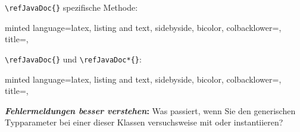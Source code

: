 \documentclass[
    ngerman,
    accentcolor=3b,
    dark_mode,
    fontsize= 12pt,
    a4paper,
    aspectratio=169,
    colorback=true,
    fancy_row_colors,
    leqno,
    fleqn,
    boxarc=3pt,
    fleqn,
]{algoslides}
\begin{document}
    \begin{frame}[c, fragile]
        \slidehead{}
        \verb+\refJavaDoc{}+ spezifische Methode:
        \begin{newcb}[
            fontsize=\scriptsize,
            escapeinside=||,
            ]{
            minted language=latex,
            listing and text,
            sidebyside,
            bicolor,
            colbacklower=,
            title=,
            }
            \begin{grayInfoBox}
            \end{grayInfoBox}
        \end{newcb}
    \end{frame}
    \begin{frame}[c, fragile]
        \slidehead{}
        \verb+\refJavaDoc{}+ und \verb+\refJavaDoc*{}+:
        \begin{newcb}[
            fontsize=\scriptsize,
            escapeinside=||,
            ]{
            minted language=latex,
            listing and text,
            sidebyside,
            bicolor,
            colbacklower=,
            title=,
            }
            \begin{grayInfoBox}
                \textbf{\emph{Fehlermeldungen besser verstehen}:}
                Was passiert, wenn Sie den generischen Typparameter  bei einer dieser Klassen versuchsweise mit
                 oder  instantiieren?
            \end{grayInfoBox}
        \end{newcb}
    \end{frame}
\end{document}
